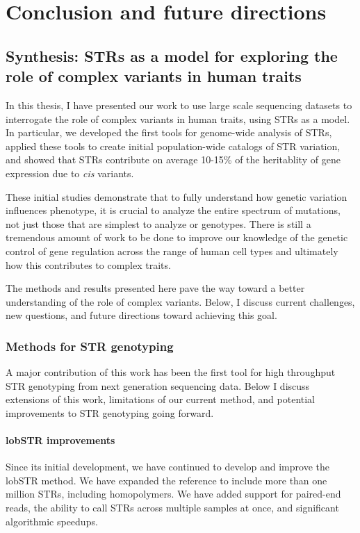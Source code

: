 \iffalse  \fi

\chapter{Conclusion and future directions}
\label{chap:conc}

\section{Synthesis: STRs as a model for exploring the role of complex variants in human traits}
In this thesis, I have presented our work to use large scale sequencing datasets to interrogate the role of complex variants in human traits, using STRs as a model. In particular, we developed the first tools for genome-wide analysis of STRs, applied these tools to create initial population-wide catalogs of STR variation, and showed that STRs contribute on average 10-15\% of the heritablity of gene expression due to \emph{cis} variants.

These initial studies demonstrate that to fully understand how genetic variation influences phenotype, it is crucial to analyze the entire spectrum of mutations, not just those that are simplest to analyze or genotypes. There is still a tremendous amount of work to be done to improve our knowledge of the genetic control of gene regulation across the range of human cell types and ultimately how this contributes to complex traits.

The methods and results presented here pave the way toward a better understanding of the role of complex variants. Below, I discuss current challenges, new questions, and future directions toward achieving this goal.

\subsection{Methods for STR genotyping}
A major contribution of this work has been the first tool for high throughput STR genotyping from next generation sequencing data. Below I discuss extensions of this work, limitations of our current method, and potential improvements to STR genotyping going forward.

\subsubsection{lobSTR improvements}
Since its initial development, we have continued to develop and improve the lobSTR method. We have expanded the reference to include more than one million STRs, including homopolymers. We have added support for paired-end reads, the ability to call STRs across multiple samples at once, and significant algorithmic speedups.


